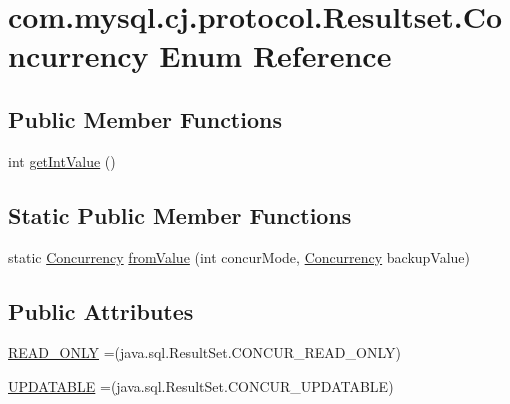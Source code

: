 \hypertarget{enumcom_1_1mysql_1_1cj_1_1protocol_1_1_resultset_1_1_concurrency}{}\section{com.\+mysql.\+cj.\+protocol.\+Resultset.\+Concurrency Enum Reference}
\label{enumcom_1_1mysql_1_1cj_1_1protocol_1_1_resultset_1_1_concurrency}
\subsection*{Public Member Functions}
\begin{DoxyCompactItemize}
\item 
int \mbox{\hyperlink{enumcom_1_1mysql_1_1cj_1_1protocol_1_1_resultset_1_1_concurrency_a0d38fb89e8f1234351cc797970c86837}{get\+Int\+Value}} ()
\end{DoxyCompactItemize}
\subsection*{Static Public Member Functions}
\begin{DoxyCompactItemize}
\item 
static \mbox{\hyperlink{enumcom_1_1mysql_1_1cj_1_1protocol_1_1_resultset_1_1_concurrency}{Concurrency}} \mbox{\hyperlink{enumcom_1_1mysql_1_1cj_1_1protocol_1_1_resultset_1_1_concurrency_a75596fc4df7c93acf786fe30f4befdd2}{from\+Value}} (int concur\+Mode, \mbox{\hyperlink{enumcom_1_1mysql_1_1cj_1_1protocol_1_1_resultset_1_1_concurrency}{Concurrency}} backup\+Value)
\end{DoxyCompactItemize}
\subsection*{Public Attributes}
\begin{DoxyCompactItemize}
\item 
\mbox{\hyperlink{enumcom_1_1mysql_1_1cj_1_1protocol_1_1_resultset_1_1_concurrency_ad95969aa1d11771ceb9081ea8447fc41}{R\+E\+A\+D\+\_\+\+O\+N\+LY}} =(java.\+sql.\+Result\+Set.\+C\+O\+N\+C\+U\+R\+\_\+\+R\+E\+A\+D\+\_\+\+O\+N\+LY)
\item 
\mbox{\hyperlink{enumcom_1_1mysql_1_1cj_1_1protocol_1_1_resultset_1_1_concurrency_a1bf39feaaedfbfc0722738fce73d919c}{U\+P\+D\+A\+T\+A\+B\+LE}} =(java.\+sql.\+Result\+Set.\+C\+O\+N\+C\+U\+R\+\_\+\+U\+P\+D\+A\+T\+A\+B\+LE)
\end{DoxyCompactItemize}


